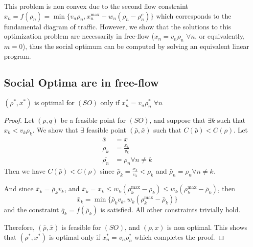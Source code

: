 This problem is non convex due to the second flow constraint $x_n = f(\rho_n) = \min \{ v_n \rho_n, x_n^{\max} - w_n(\rho_n - \rho_n^c)\}$
which corresponds to the fundamental diagram of traffic. However, we show that the solutions to this optimization problem are necessarily in free-flow ($x_n = v_n \rho_n$ $\forall n$, or equivalently, $m = 0$), thus the social optimum can be computed by solving an equivalent linear program.


\subsection{Social Optima are in free-flow}
\begin{lemma}
\label{lemma:relaxedTTT_is_ff}
$(\rho^*, x^*)$ is optimal for $(SO)$ only if $x^*_n = v_n \rho^*_n$ $\forall n$
\end{lemma}


\begin{proof}
Let $( \rho,  q)$ be a feasible point for $(SO)$, and suppose that $\exists k$ such that $x_k < v_k \rho_k$. We show that $\exists$ feasible point $(\bar{ \rho}, \bar{ x})$ such that $C(\bar{ \rho}) < C( \rho)$.
Let
\begin{align*}
\bar{x} &= x\\
\bar{\rho}_k &= \frac{x_k}{v_k}\\
\bar{\rho_n} &= \rho_n \forall n \neq k
\end{align*}
Then we have $C(\bar{ \rho}) < C( \rho)$ since $\bar{\rho}_k = \frac{x_k}{v_k} < \rho_k$ and $\bar{\rho}_n = \rho_n \forall n \neq k$.

And since $\bar{x}_k = \bar{\rho}_k v_k$, and $\bar{x}_k = x_k \leq w_k(\rho_k^{\max} - \rho_k ) \leq w_k(\rho_k^{\max} - \bar{\rho}_k )$, then
\[
\bar{x}_k = \min \{ \bar{\rho}_k v_k,  w_k(\rho_k^{\max} - \bar{\rho}_k ) \}
\]
and the constraint $\bar{q}_k = f(\bar{\rho}_k)$ is satisfied. All other constraints trivially hold.

Therefore, $(\bar{ \rho}, \bar{ x})$ is feasible for $(SO)$, and $( \rho,  x)$ is non optimal. This shows that $( \rho^*,  x^*)$ is optimal only if $x^*_n = v_n \rho^*_n$ which completes the proof.
\end{proof}

\bigskip

